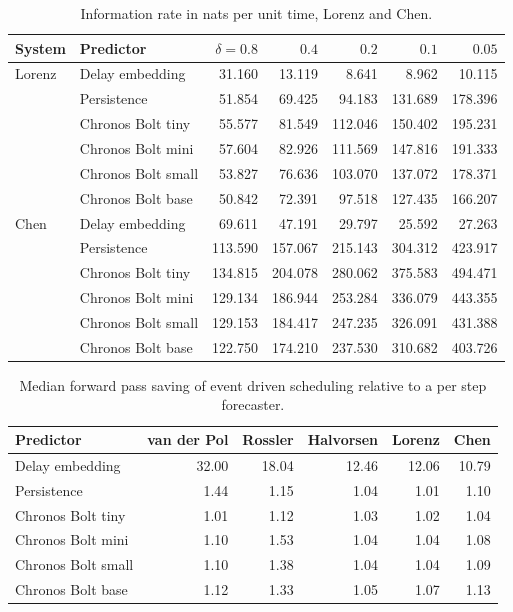 \documentclass{article}
\begin{document}
\begin{table}[h]
  \centering
  \caption{Information rate in nats per unit time, Lorenz and Chen.}
  \label{tab:full2}
  \small
  \begin{tabular}{llrrrrr}
    \toprule
    System & Predictor & $\delta = 0.8$ & $0.4$ & $0.2$ & $0.1$ & $0.05$ \\
    \midrule
    Lorenz & Delay embedding & 31.160 & 13.119 & 8.641 & 8.962 & 10.115 \\
    & Persistence & 51.854 & 69.425 & 94.183 & 131.689 & 178.396 \\
    & Chronos Bolt tiny & 55.577 & 81.549 & 112.046 & 150.402 & 195.231 \\
    & Chronos Bolt mini & 57.604 & 82.926 & 111.569 & 147.816 & 191.333 \\
    & Chronos Bolt small & 53.827 & 76.636 & 103.070 & 137.072 & 178.371 \\
    & Chronos Bolt base & 50.842 & 72.391 & 97.518 & 127.435 & 166.207 \\
    \midrule
    Chen & Delay embedding & 69.611 & 47.191 & 29.797 & 25.592 & 27.263 \\
    & Persistence & 113.590 & 157.067 & 215.143 & 304.312 & 423.917 \\
    & Chronos Bolt tiny & 134.815 & 204.078 & 280.062 & 375.583 & 494.471 \\
    & Chronos Bolt mini & 129.134 & 186.944 & 253.284 & 336.079 & 443.355 \\
    & Chronos Bolt small & 129.153 & 184.417 & 247.235 & 326.091 & 431.388 \\
    & Chronos Bolt base & 122.750 & 174.210 & 237.530 & 310.682 & 403.726 \\
    \bottomrule
  \end{tabular}
\end{table}

\begin{table}[h]
  \centering
  \caption{Median forward pass saving of event driven scheduling relative to a per step forecaster.}
  \label{tab:passes}
  \small
  \begin{tabular}{lrrrrr}
    \toprule
    Predictor & van der Pol & Rossler & Halvorsen & Lorenz & Chen \\
    \midrule
    Delay embedding & 32.00 & 18.04 & 12.46 & 12.06 & 10.79 \\
    Persistence & 1.44 & 1.15 & 1.04 & 1.01 & 1.10 \\
    Chronos Bolt tiny & 1.01 & 1.12 & 1.03 & 1.02 & 1.04 \\
    Chronos Bolt mini & 1.10 & 1.53 & 1.04 & 1.04 & 1.08 \\
    Chronos Bolt small & 1.10 & 1.38 & 1.04 & 1.04 & 1.09 \\
    Chronos Bolt base & 1.12 & 1.33 & 1.05 & 1.07 & 1.13 \\
    \bottomrule
  \end{tabular}
\end{table}
\end{document}
